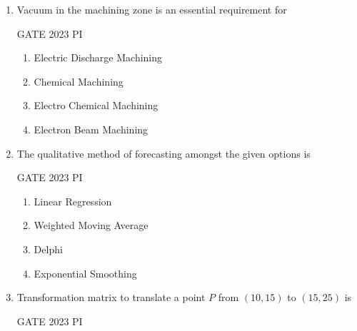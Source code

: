 \documentclass[journal,12pt,onecolumn]{IEEEtran}
\theoremstyle{remark}
\begin{document}
\begin{enumerate}
\item Vacuum in the machining zone is an essential requirement for

\hfill{GATE 2023 PI}

\begin{multicols}{2}
\begin{enumerate}
    \item Electric Discharge Machining
    \item Chemical Machining
    \item Electro Chemical Machining
    \item Electron Beam Machining
\end{enumerate}
\end{multicols}
\item The qualitative method of forecasting amongst the given options is

\hfill{GATE 2023 PI}

\begin{multicols}{2}
\begin{enumerate}
    \item Linear Regression
    \item Weighted Moving Average
    \item Delphi
    \item Exponential Smoothing
\end{enumerate}
\end{multicols}

\item Transformation matrix to translate a point $P$ from $(10, 15)$ to $(15, 25)$ is

\hfill{GATE 2023 PI}


\end{enumerate}
\end{document}
